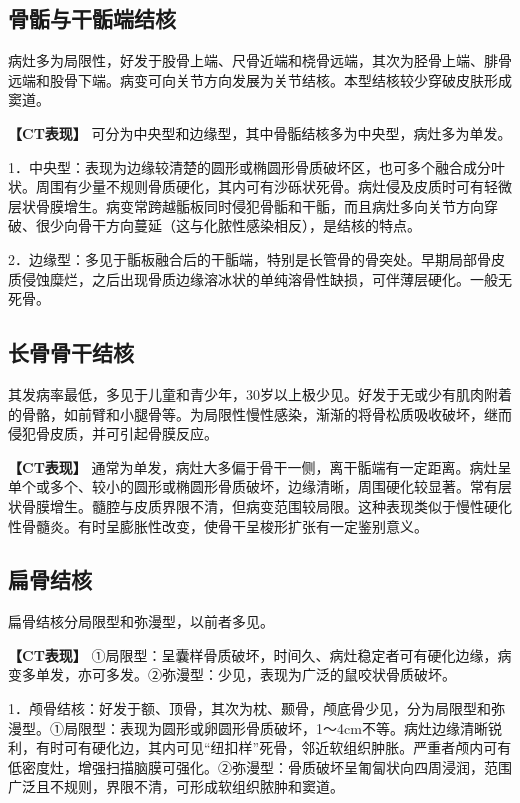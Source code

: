 \subsection{骨骺与干骺端结核}

病灶多为局限性，好发于股骨上端、尺骨近端和桡骨远端，其次为胫骨上端、腓骨远端和股骨下端。病变可向关节方向发展为关节结核。本型结核较少穿破皮肤形成窦道。

\textbf{【CT表现】}
可分为中央型和边缘型，其中骨骺结核多为中央型，病灶多为单发。

1．中央型：表现为边缘较清楚的圆形或椭圆形骨质破坏区，也可多个融合成分叶状。周围有少量不规则骨质硬化，其内可有沙砾状死骨。病灶侵及皮质时可有轻微层状骨膜增生。病变常跨越骺板同时侵犯骨骺和干骺，而且病灶多向关节方向穿破、很少向骨干方向蔓延（这与化脓性感染相反），是结核的特点。

2．边缘型：多见于骺板融合后的干骺端，特别是长管骨的骨突处。早期局部骨皮质侵蚀糜烂，之后出现骨质边缘溶冰状的单纯溶骨性缺损，可伴薄层硬化。一般无死骨。

\subsection{长骨骨干结核}

其发病率最低，多见于儿童和青少年，30岁以上极少见。好发于无或少有肌肉附着的骨骼，如前臂和小腿骨等。为局限性慢性感染，渐渐的将骨松质吸收破坏，继而侵犯骨皮质，并可引起骨膜反应。

\textbf{【CT表现】}
通常为单发，病灶大多偏于骨干一侧，离干骺端有一定距离。病灶呈单个或多个、较小的圆形或椭圆形骨质破坏，边缘清晰，周围硬化较显著。常有层状骨膜增生。髓腔与皮质界限不清，但病变范围较局限。这种表现类似于慢性硬化性骨髓炎。有时呈膨胀性改变，使骨干呈梭形扩张有一定鉴别意义。

\subsection{扁骨结核}

扁骨结核分局限型和弥漫型，以前者多见。

\textbf{【CT表现】}
①局限型：呈囊样骨质破坏，时间久、病灶稳定者可有硬化边缘，病变多单发，亦可多发。②弥漫型：少见，表现为广泛的鼠咬状骨质破坏。

1．颅骨结核：好发于额、顶骨，其次为枕、颞骨，颅底骨少见，分为局限型和弥漫型。①局限型：表现为圆形或卵圆形骨质破坏，1～4cm不等。病灶边缘清晰锐利，有时可有硬化边，其内可见“纽扣样”死骨，邻近软组织肿胀。严重者颅内可有低密度灶，增强扫描脑膜可强化。②弥漫型：骨质破坏呈匍匐状向四周浸润，范围广泛且不规则，界限不清，可形成软组织脓肿和窦道。

